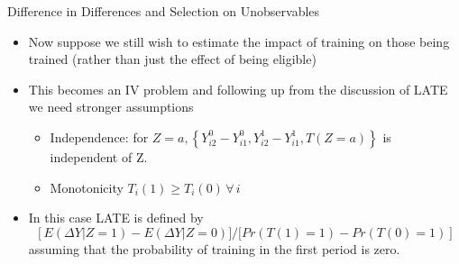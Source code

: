 \documentclass[xcolor=pdftex,dvipsnames,table,mathserif,aspectratio=169]{beamer}
\begin{document}
\begin{frame}{Difference in Differences and Selection on Unobservables}
\begin{itemize}
\item Now suppose we still wish to estimate the impact of training on those being trained (rather than just the effect of being eligible)
\item This becomes an IV problem and following up from the discussion of LATE we need stronger assumptions
\begin{itemize}
\item  Independence: for $Z = a, \left\{Y_{i2}^0 - Y_{i1}^0, Y_{i2}^1 - Y_{i1}^1, T(Z=a)\right\}$ is independent of Z.
\item Monotonicity $T_i(1) \ge T_i(0) \, \forall \, i$
\end{itemize}
\item In this case LATE is defined by
 $$\left [E(\Delta Y | Z = 1) - E(\Delta Y | Z = 0)] / [Pr(T(1) = 1) - Pr(T(0) = 1) \right]$$
assuming that the probability of training in the first period is zero.
\end{itemize}              
\end{frame}
\end{document}
